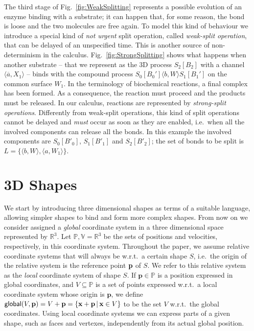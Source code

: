 \documentclass[11pt]{article}
\newcommand{\reference}{{\sf global}}
\newcommand{\real}{\mathbb{R}}
\newcommand{\pos}{{\mathbb P}}
\newcommand{\vel}{{\mathbb V}}
\begin{document}
The third stage of Fig.~\ref{fig:WeakSplitting} represents a possible evolution of an enzyme binding with a substrate; it can happen that, for some reason, the bond is loose and the two molecules are free again. To model this kind of behaviour we introduce a special kind of {\em not urgent} split operation, called {\em weak-split operation}, that can be delayed of an unspecified time. This is another source of non-determinism in the calculus. Fig.~\ref{fig:StrongSplitting} shows what happens when another substrate -- that we represent as the 3D process $S_2[B_2]$ with a channel $\langle \overline{a}, X_1 \rangle$  -- binds with the compound process $S_0[B_0']\langle b, W \rangle S_1[B_1']$ on the common surface $W_1$. In the terminology of biochemical reactions, a final complex has been formed. As a consequence, the reaction must proceed and the products must be released. In our calculus, reactions are represented by  {\em strong-split operations}. Differently from weak-split operations, this kind of split operations cannot be delayed and {\em must} occur as soon as they are enabled, i.e.\ when all the involved components can release all the bonds. In this example the involved components are $S_0[B'_0]$, $S_1[B'_1]$ and $S_2[B'_2]$; the set of bonds to be split is $L= \{\langle b, W \rangle, \langle a, W_1 \rangle \}$.

\section{3D Shapes}
\label{sec:3ds}

We start by introducing three dimensional shapes as terms of a suitable language, allowing simpler shapes to bind and form more complex shapes. From now on we consider assigned a {\em global} coordinate system in a three dimensional space represented by $\real^3$. Let $\pos, \vel = \real^3$ be the sets of positions and velocities, respectively, in this coordinate system. Throughout the paper, we assume relative coordinate systems that will always be w.r.t.\ a certain shape $S$, i.e.\ the origin of the relative system is the reference point ${\bf p}$ of $S$. We refer to this relative system as the {\em local} coordinate system of shape $S$. If $\mathbf{p} \in \pos$ is a position expressed in global coordinates, and $V \subseteq \pos$ is a set of points expressed w.r.t.\ a local coordinate system whose origin is $\mathbf{p}$, we define $\reference(V, {\bf p}) = V + {\bf p} = \{ {\bf x} + {\bf p} \,|\, {\bf x} \in V\}$ to be the set $V$ w.r.t.\ the global coordinates. Using local coordinate systems we can express parts of a given shape, such as faces and vertexes, independently from its actual global position.
\end{document}
